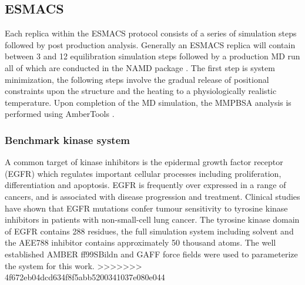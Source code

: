 \subsection{ESMACS}

Each replica within the ESMACS protocol consists of a series of simulation steps followed by post production analysis.
Generally an ESMACS replica will contain between 3 and 12 equilibration simulation steps followed by a production MD run all of which are conducted in the NAMD package \cite{Phillips2005}.
The first step is system minimization, the following steps involve the gradual release of positional constraints upon the structure and the heating to a physiologically realistic temperature.
Upon completion of the MD simulation, the MMPBSA analysis is performed using AmberTools \cite{amber14, Case2005, MillerIII2012}.

\subsubsection{Benchmark kinase system}

A common target of kinase inhibitors is the epidermal growth factor receptor (EGFR) which regulates important cellular processes including proliferation, differentiation and apoptosis.
EGFR is frequently over expressed in a range of cancers, and is associated with disease progression and treatment. 
Clinical studies have shown that EGFR mutations confer tumour sensitivity to tyrosine kinase inhibitors in patients with non-small-cell lung cancer.
The tyrosine kinase domain of EGFR contains 288 residues, the full simulation system including solvent and the AEE788 inhibitor contains approximately 50 thousand atoms.
The well established AMBER ff99SBildn and GAFF force fields \cite{Maier2015, Wang2004} were used to parameterize the system for this work.
>>>>>>> 4f672eb04dcd634f8f5abb5200341037e080e044
